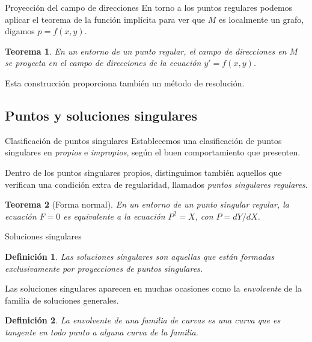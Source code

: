 \documentclass[10pt, spanish]{beamer}
\newtheorem{teorema}{Teorema}
\newtheorem{defi}{Definición}
\begin{document}
\begin{frame}{Proyección del campo de direcciones}
  En torno a los puntos regulares podemos aplicar el teorema de la función implícita para ver que $M$ es localmente un grafo, digamos $p=f(x,y)$.
  \vspace{0.5em}

\begin{teorema}
  En un entorno de un punto regular, el campo de direcciones en $M$ se proyecta en el campo de direcciones de la ecuación $y'=f(x,y)$.
\end{teorema}

  \vspace{0.5em}
  Esta construcción proporciona también un método de resolución.
\end{frame}

\subsection{Puntos y soluciones singulares}

\begin{frame}{Clasificación de puntos singulares}
  Establecemos una clasificación de puntos singulares en \textit{propios} e \textit{impropios}, según el buen comportamiento que presenten.
  \vspace{0.5em}

  Dentro de los puntos singulares propios, distinguimos también aquellos que verifican una condición extra de regularidad, llamados \textit{puntos singulares regulares}.
  \vspace{0.75em}
  \begin{teorema}[Forma normal]
    En un entorno de un punto singular regular, la ecuación $F=0$ es equivalente a la ecuación $P^2=X$, con $P=dY/dX$.
  \end{teorema}
\end{frame}

\begin{frame}{Soluciones singulares}
  \begin{defi}
    Las soluciones singulares son aquellas que están formadas exclusivamente por proyecciones de puntos singulares.
  \end{defi}

  Las soluciones singulares aparecen en muchas ocasiones como la \textit{envolvente} de la familia de soluciones generales.

  \vspace{0.5em}
  \begin{defi}
    La envolvente de una familia de curvas es una curva que es tangente en todo punto a alguna curva de la familia.
  \end{defi}
\end{frame}
\end{document}
